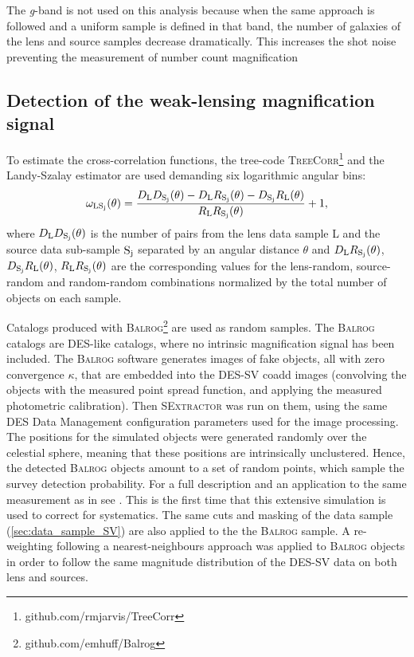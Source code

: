 The {\it g}-band is not used on this analysis because when the same approach is followed and a uniform sample is defined in that band, the number of galaxies of the lens and source samples decrease dramatically. This increases the shot noise preventing the measurement of number count magnification

\subsection{Detection of the weak-lensing magnification signal}
To estimate the cross-correlation functions, the tree-code {\scshape TreeCorr}\footnote{github.com/rmjarvis/TreeCorr} \cite{2004MNRAS.352..338J} and the Landy-Szalay estimator \cite{1993ApJ...412...64L} are used demanding six logarithmic angular bins:
\begin{equation}
\omega_{\rm LS_j}(\theta) = \frac{D_{\rm L}D_{\rm S_j}(\theta)-D_{\rm L}R_{\rm S_j}(\theta)-D_{\rm S_j}R_{\rm L}(\theta)}{R_{\rm L}R_{\rm S_j}(\theta)}+1,
\label{eq:landyszalay}
\end{equation}
where $D_{\rm L}D_{\rm S_j}(\theta)$ is the number of pairs from the lens data sample L and the source data sub-sample $\rm S_j$ separated by an angular distance $\theta$ and $D_{\rm L}R_{\rm S_j}(\theta)$, $D_{\rm S_j}R_{\rm L}(\theta)$, $R_{\rm L}R_{\rm S_j}(\theta)$ are the corresponding values for the lens-random, source-random and random-random combinations normalized by the total number of objects on each sample.
\newline

Catalogs produced with {\scshape Balrog}\footnote{github.com/emhuff/Balrog} \cite{2016MNRAS.457..786S} are used as random samples. The {\scshape Balrog} catalogs are DES-like catalogs, where
no intrinsic magnification signal has been included. The {\scshape Balrog} software generates images of fake objects, all with zero convergence $\kappa$, that are embedded into the DES-SV coadd images
(convolving the objects with the measured point spread function, and applying the measured photometric calibration). Then {\scshape SExtractor} was run on them, using the same DES Data Management configuration parameters used for the image processing. The positions for the simulated objects were generated randomly over the celestial sphere, meaning that these positions are intrinsically unclustered. Hence, the detected {\scshape Balrog} objects amount to a set of random points, which sample the survey detection probability. For a full description and an application to the same measurement as in \cite{2016MNRAS.455.4301C} see \cite{2016MNRAS.457..786S}. This is the first time that this extensive simulation is used to correct for systematics. The same cuts and masking of the data sample (\autoref{sec:data_sample_SV}) are also applied to the the {\scshape Balrog} sample. A re-weighting following a nearest-neighbours approach was applied to {\scshape Balrog} objects in order to follow the same magnitude distribution of the DES-SV data on both lens and sources.
\newline

